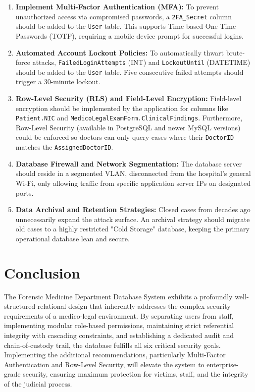 \documentclass[12pt,a4paper]{article}
\begin{document}
\begin{enumerate}
    \item \textbf{Implement Multi-Factor Authentication (MFA):} 
    To prevent unauthorized access via compromised passwords, a \texttt{2FA\_Secret} column should be added to the \texttt{User} table. This supports Time-based One-Time Passwords (TOTP), requiring a mobile device prompt for successful logins.
    
    \item \textbf{Automated Account Lockout Policies:} 
    To automatically thwart brute-force attacks, \texttt{FailedLoginAttempts} (INT) and \texttt{LockoutUntil} (DATETIME) should be added to the \texttt{User} table. Five consecutive failed attempts should trigger a 30-minute lockout.
    
    \item \textbf{Row-Level Security (RLS) and Field-Level Encryption:} 
    Field-level encryption should be implemented by the application for columns like \texttt{Patient.NIC} and \texttt{MedicoLegalExamForm.ClinicalFindings}. Furthermore, Row-Level Security (available in PostgreSQL and newer MySQL versions) could be enforced so doctors can only query cases where their \texttt{DoctorID} matches the \texttt{AssignedDoctorID}.
    
    \item \textbf{Database Firewall and Network Segmentation:}
    The database server should reside in a segmented VLAN, disconnected from the hospital's general Wi-Fi, only allowing traffic from specific application server IPs on designated ports.
    
    \item \textbf{Data Archival and Retention Strategies:} 
    Closed cases from decades ago unnecessarily expand the attack surface. An archival strategy should migrate old cases to a highly restricted "Cold Storage" database, keeping the primary operational database lean and secure.
\end{enumerate}

\section{Conclusion}
The Forensic Medicine Department Database System exhibits a profoundly well-structured relational design that inherently addresses the complex security requirements of a medico-legal environment. By separating users from staff, implementing modular role-based permissions, maintaining strict referential integrity with cascading constraints, and establishing a dedicated audit and chain-of-custody trail, the database fulfills all six critical security goals. Implementing the additional recommendations, particularly Multi-Factor Authentication and Row-Level Security, will elevate the system to enterprise-grade security, ensuring maximum protection for victims, staff, and the integrity of the judicial process.
\end{document}
